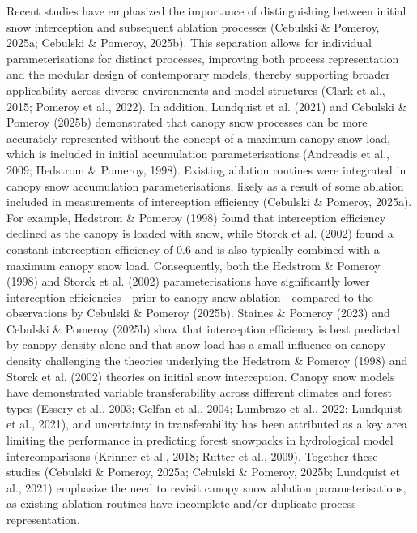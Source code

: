 \documentclass[
]{agujournal2019}
\begin{document}
Recent studies have emphasized the importance of distinguishing between
initial snow interception and subsequent ablation processes (Cebulski \&
Pomeroy, 2025a; Cebulski \& Pomeroy, 2025b). This separation allows for
individual parameterisations for distinct processes, improving both
process representation and the modular design of contemporary models,
thereby supporting broader applicability across diverse environments and
model structures (Clark et al., 2015; Pomeroy et al., 2022). In
addition, Lundquist et al. (2021) and Cebulski \& Pomeroy (2025b)
demonstrated that canopy snow processes can be more accurately
represented without the concept of a maximum canopy snow load, which is
included in initial accumulation parameterisations (Andreadis et al.,
2009; Hedstrom \& Pomeroy, 1998). Existing ablation routines were
integrated in canopy snow accumulation parameterisations, likely as a
result of some ablation included in measurements of interception
efficiency (Cebulski \& Pomeroy, 2025a). For example, Hedstrom \&
Pomeroy (1998) found that interception efficiency declined as the canopy
is loaded with snow, while Storck et al. (2002) found a constant
interception efficiency of 0.6 and is also typically combined with a
maximum canopy snow load. Consequently, both the Hedstrom \& Pomeroy
(1998) and Storck et al. (2002) parameterisations have significantly
lower interception efficiencies---prior to canopy snow
ablation---compared to the observations by Cebulski \& Pomeroy (2025b).
Staines \& Pomeroy (2023) and Cebulski \& Pomeroy (2025b) show that
interception efficiency is best predicted by canopy density alone and
that snow load has a small influence on canopy density challenging the
theories underlying the Hedstrom \& Pomeroy (1998) and Storck et al.
(2002) theories on initial snow interception. Canopy snow models have
demonstrated variable transferability across different climates and
forest types (Essery et al., 2003; Gelfan et al., 2004; Lumbrazo et al.,
2022; Lundquist et al., 2021), and uncertainty in transferability has
been attributed as a key area limiting the performance in predicting
forest snowpacks in hydrological model intercomparisons (Krinner et al.,
2018; Rutter et al., 2009). Together these studies (Cebulski \& Pomeroy,
2025a; Cebulski \& Pomeroy, 2025b; Lundquist et al., 2021) emphasize the
need to revisit canopy snow ablation parameterisations, as existing
ablation routines have incomplete and/or duplicate process
representation.
\end{document}

